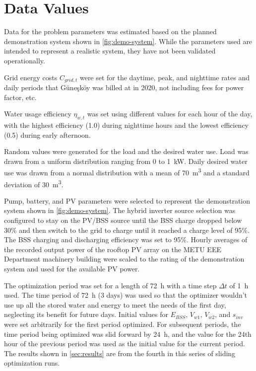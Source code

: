 \section{Data Values}
\label{sec:data-values}

Data for the problem parameters was estimated based on the planned demonstration system shown in \cref{fig:demo-system}.
While the parameters used are intended to represent a realistic system, they have not been validated operationally.

Grid energy costs $C_{grid,t}$ were set for the daytime, peak, and nighttime rates and daily periods that Güneşköy was billed at in 2020, not including fees for power factor, etc.

Water usage efficiency $\eta_{w,t}$ was set using different values for each hour of the day, with the highest efficiency (\num{1.0}) during nighttime hours and the lowest efficiency (\num{0.5}) during early afternoon.

Random values were generated for the load and the desired water use. Load was drawn from a uniform distribution ranging from 0 to \SI{1}{kW}.
Daily desired water use was drawn from a normal distribution with a mean of \SI{70}{m^3} and a standard deviation of \SI{30}{m^3}.

Pump, battery, and PV parameters were selected to represent the demonstration system shown in \cref{fig:demo-system}.
The hybrid inverter source selection was configured to stay on the PV/BSS source until the BSS charge dropped below 30\% and then switch to the grid to charge until it reached a charge level of 95\%.
The BSS charging and discharging efficiency was set to 95\%.
Hourly averages of the recorded output power of the rooftop PV array on the METU EEE Department machinery building were scaled to the rating of the demonstration system and used for the available PV power.

The optimization period was set for a length of \SI{72}{h} with a time step $\Delta t$ of \SI{1}{h} used. The time period of \SI{72}{h} (3 days) was used so that the optimizer wouldn't use up all the stored water and energy to meet the needs of the first day, neglecting its benefit for future days.
Initial values for $E_{BSS}$, $V_{w1}$, $V_{w2}$, and $s_{inv}$ were set arbitrarily for the first period optimized.
For subsequent periods, the time period being optimized was slid forward by \SI{24}{h}, and the value for the 24th hour of the previous period was used as the initial value for the current period.
The results shown in \cref{sec:results} are from the fourth in this series of sliding optimization runs.